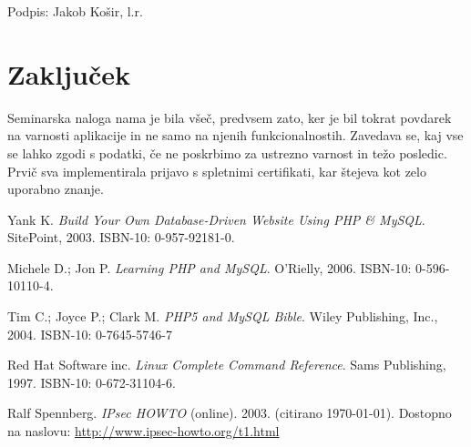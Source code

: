 \documentclass[a4paper,12pt]{report}
\newcommand{\drugiavtor} {Jakob Košir}
\begin{document}
Podpis: {\drugiavtor}, l.r.

\newpage

\chapter{Zaključek}

Seminarska naloga nama je bila všeč, predvsem zato, ker je bil tokrat povdarek na varnosti aplikacije in ne samo na njenih funkcionalnostih. Zavedava se, kaj vse se lahko zgodi s podatki, če ne poskrbimo za ustrezno varnost in težo posledic. Prvič sva implementirala prijavo s spletnimi certifikati, kar štejeva kot zelo uporabno znanje. 

\begin{thebibliography}{99}
\addtocounter{chapter}{1}

 Yank K. \emph{Build Your Own Database-Driven Website Using PHP \& MySQL}. SitePoint, 2003. ISBN-10: 0-957-92181-0.

 Michele D.; Jon P. \emph{Learning PHP and MySQL}. O'Rielly, 2006. ISBN-10: 0-596-10110-4.

 Tim C.; Joyce P.; Clark M. \emph{PHP5 and MySQL Bible}. Wiley Publishing, Inc., 2004. ISBN-10: 0-7645-5746-7

 Red Hat Software inc. \emph{Linux Complete Command Reference}. Sams Publishing, 1997. ISBN-10: 0-672-31104-6.

 Ralf Spennberg. \emph{IPsec HOWTO} (online). 2003. (citirano \today). Dostopno na naslovu:
\url{http://www.ipsec-howto.org/t1.html}

\end{thebibliography}
\end{document}
